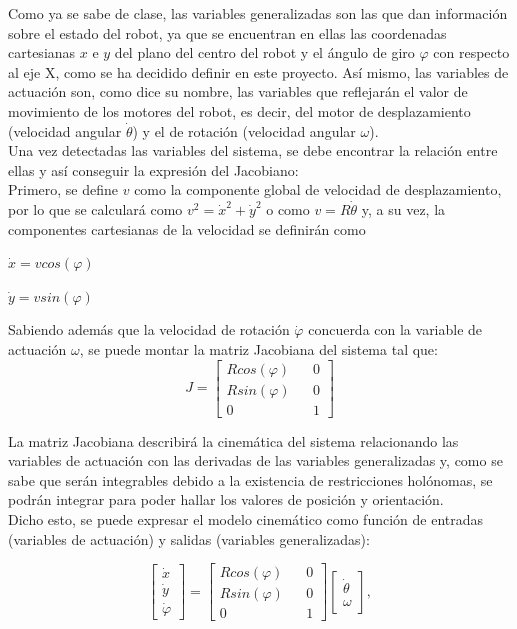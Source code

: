 \documentclass[a4paper,twoside]{article}
\begin{document}
	Como ya se sabe de clase, las variables generalizadas son las que dan información sobre el estado del robot, ya que se encuentran en ellas las coordenadas cartesianas $x$ e $y$ del plano del centro del robot y el ángulo de giro $\varphi$ con respecto al eje X, como se ha decidido definir en este proyecto. Así mismo, las variables de actuación son, como dice su nombre, las variables que reflejarán el valor de movimiento de los motores del robot, es decir, del motor de desplazamiento (velocidad angular $\dot{\theta}$) y el de rotación (velocidad angular $\omega$).\\
	
	Una vez detectadas las variables del sistema, se debe encontrar la relación entre ellas y así conseguir la expresión del Jacobiano:\\
	
	Primero, se define $v$ como la componente global de velocidad de desplazamiento, por lo que se calculará como $v^2=\dot{x}^2+\dot{y}^2$ o como $v=R \dot{\theta}$ y, a su vez, la componentes cartesianas de la velocidad se definirán como\par
	
	{\centering $\dot{x}=v cos(\varphi)$\par} {\centering $\dot{y}=v sin(\varphi)$\\}
	
		
	Sabiendo además que la velocidad de rotación $\dot{\varphi}$ concuerda con la variable de actuación $\omega$, se puede montar la matriz Jacobiana del sistema tal que:
		$$
		J=
		\begin{bmatrix}
			R cos(\varphi) && 0\\
			R sin(\varphi) && 0\\
			0 && 1
		\end{bmatrix}
		$$

	La matriz Jacobiana describirá la cinemática del sistema relacionando las variables de actuación con las derivadas de las variables generalizadas y, como se sabe que serán integrables debido a la existencia de restricciones holónomas, se podrán integrar para poder hallar los valores de posición y orientación.\\
	
	Dicho esto, se puede expresar el modelo cinemático como función de entradas (variables de actuación) y salidas (variables generalizadas):
	
		$$
		\begin{bmatrix}
		\dot{x}\\\dot{y}\\\dot{\varphi}
		\end{bmatrix}
		=
		\begin{bmatrix}
		R cos(\varphi) && 0\\
		R sin(\varphi) && 0\\
		0 && 1
		\end{bmatrix}
		\begin{bmatrix}
		\dot{\theta}\\\omega
		\end{bmatrix},
		$$
\end{document}
